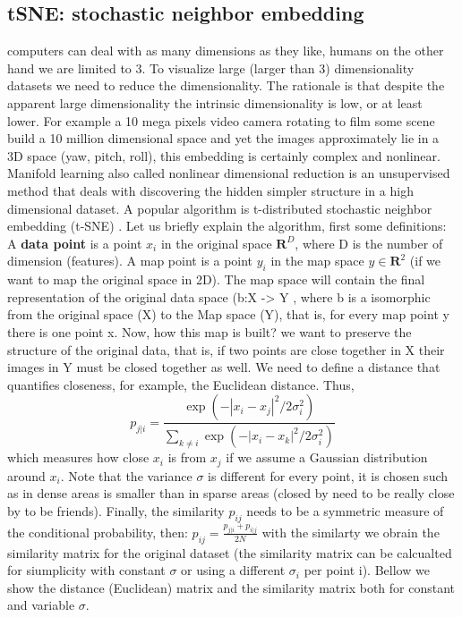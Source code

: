 \documentclass[12pt]{report}
\begin{document}
\subsection{tSNE: stochastic neighbor embedding}
computers can deal with as many dimensions as they like, humans on the other hand we are limited to 3. To visualize large (larger than 3) dimensionality datasets we need to reduce the dimensionality. The rationale is that despite the apparent large dimensionality the intrinsic dimensionality is low, or at least lower. For example a 10 mega pixels video camera rotating to film some scene build a 10 million dimensional space and yet the images approximately lie in a 3D space (yaw, pitch, roll), this embedding is certainly complex and nonlinear.
Manifold learning also called nonlinear dimensional reduction is an unsupervised method that deals with discovering the hidden simpler structure in a high dimensional dataset.
A popular algorithm is t-distributed stochastic neighbor embedding (t-SNE) \cite{maaten2008visualizing}.
Let us briefly explain the algorithm, first some definitions:
A \textbf{data point} is a point $x_i$ in the original space $\mathbf{R}^D$, where D is the number of dimension (features). A map point is a point $y_i$ in the map space $y \in \mathbf{R}^2$ (if we want to map the original space in 2D). The map space will contain the final representation of the original data space (b:X -> Y , where b is a isomorphic from the original space (X) to the Map space (Y), that is, for every map point y there is one point x. 
Now, how this map is built? we want to preserve the structure of the original data, that is, if two points are close together in X their images in Y must be closed together as well. We need to define a distance that quantifies closeness, for example, the Euclidean distance. Thus, 
\begin{equation}
p_{j|i} = \frac{\exp\left(-\left| x_i - x_j\right|^2 \big/ 2\sigma_i^2\right)}{\displaystyle\sum_{k \neq i} \exp\left(-\left| x_i - x_k\right|^2 \big/ 2\sigma_i^2\right)}
\end{equation}
which measures how close $x_i$ is from $x_j$ if we assume a Gaussian distribution around $x_i$. Note that the variance $\sigma$ is different for every point, it is chosen such as in dense areas is smaller than in sparse areas (closed by need to be really close by to be friends). 
Finally, the similarity $p_{ij}$ needs to be a symmetric measure of the conditional probability, then:
\(p_{ij} = \frac{p_{j|i} + p_{i|j}}{2N}\)
with the similarty we obrain the similarity matrix for the original dataset (the similarity matrix can be calcualted for siumplicity with constant $\sigma$ or using a different $\sigma_i$ per point i).
Bellow we show the distance (Euclidean) matrix and the similarity matrix both for constant and variable $\sigma$.
\end{document}
